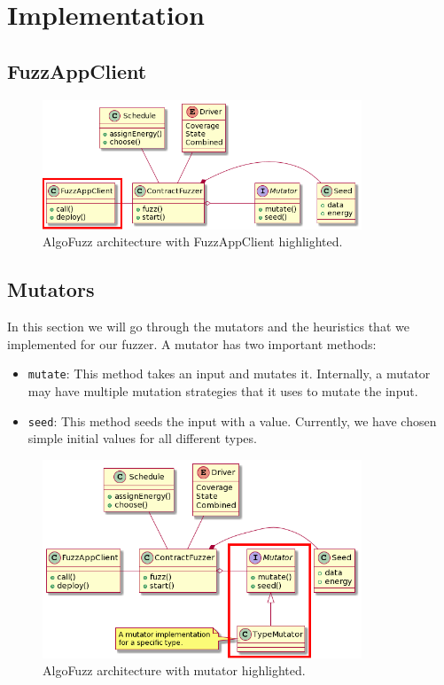 \section{Implementation} \label{section:implementation}

\subsection*{FuzzAppClient}

\begin{figure}[htbp]
    \centering
    \includegraphics[width=0.85\textwidth]{figures/arc-client.png}
    \caption{AlgoFuzz architecture with FuzzAppClient highlighted.}\label{fig:architecture-client}
\end{figure}

\subsection*{Mutators} \label{section:mutators}
In this section we will go through the mutators and the heuristics that we implemented for our fuzzer.
A mutator has two important methods:
\begin{itemize}
    \item \texttt{mutate}: This method takes an input and mutates it.
          Internally, a mutator may have multiple mutation strategies that it uses to mutate the input.
    \item \texttt{seed}: This method seeds the input with a value.
          Currently, we have chosen simple initial values for all different types.
\end{itemize}


\begin{figure}[htbp]
    \centering
    \includegraphics[width=0.85\textwidth]{figures/arc-mutator-r.png}
    \caption{AlgoFuzz architecture with mutator highlighted.}\label{fig:architecture-mutator}
\end{figure}

